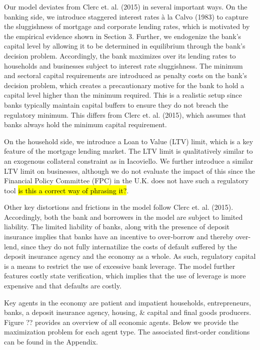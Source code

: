 \documentclass[12pt]{article}
\numberwithin{equation}{section}
\begin{document}
Our model deviates from Clerc et. al. (2015) in several important ways. On the banking side, we introduce staggered interest rates à la Calvo (1983) to capture the sluggishness of mortgage and corporate lending rates, which is motivated by the empirical evidence shown in Section 3. Further, we endogenize the bank's capital level by allowing it to be determined in equilibrium through the bank's decision problem. Accordingly, the bank maximizes over its lending rates to households and businesses subject to interest rate sluggishness. The minimum and sectoral capital requirements are introduced as penalty costs on the bank's decision problem, which creates a precautionary motive for the bank to hold a capital level higher than the minimum required. This is a realistic setup since banks typically maintain capital buffers to ensure they do not breach the regulatory minimum. This differs from Clerc et. al. (2015), which assumes that banks always hold the minimum capital requirement. 


On the household side, we introduce a Loan to Value (LTV) limit, which is a key feature of the mortgage lending market. The LTV limit is qualitatively similar to an exogenous collateral constraint as in Iacoviello. We further introduce a similar LTV limit on businesses, although we do not evaluate the impact of this since the Financial Policy Committee (FPC) in the U.K. does not have such a regulatory tool \hl{is this a correct way of phrasing it?}. 


Other key distortions and frictions in the model follow Clerc et. al. (2015). Accordingly, both the bank and borrowers in the model are subject to limited liability. The limited liability of banks, along with the presence of deposit insurance implies that banks have an incentive to over-borrow and thereby over-lend, since they do not fully internatilize the costs of default suffered by the deposit insurance agency and the economy as a whole. As such, regulatory capital is a means to restrict the use of excessive bank leverage. The model further features costly state verification, which implies that the use of leverage is more expensive and that defaults are costly. 


Key agents in the economy are patient and impatient households, entrepreneurs, banks, a deposit insurance agency, housing, \& capital and final goods producers. Figure ?? provides an overview of all economic agents. Below we provide the maximization problem for each agent type. The associated first-order conditions can be found in the Appendix. 
\end{document}
